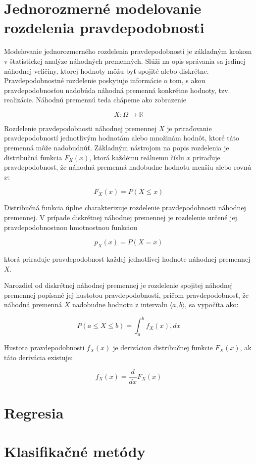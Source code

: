 \section{Jednorozmerné modelovanie rozdelenia pravdepodobnosti}\label{sec:1D_modelovanie}

Modelovanie jednorozmerného rozdelenia pravdepodobnosti je základným krokom v štatistickej analýze náhodných premenných. Slúži na opis správania sa jedinej náhodnej veličiny, ktorej hodnoty môžu byť spojité alebo diskrétne. Pravdepodobnostné rozdelenie poskytuje informácie o tom, s akou pravdepodobnosťou nadobúda náhodná premenná konkrétne hodnoty, tzv. realizácie. Náhodnú premennú teda chápeme ako zobrazenie 

\begin{equation*} 
X: \Omega \to \mathbb{R} 
\end{equation*}

Rozdelenie pravdepodobnosti náhodnej premennej $X$ je priraďovanie pravdepodobností jednotlivým hodnotám alebo množinám hodnôt, ktoré táto premenná môže nadobudnúť. Základným nástrojom na popis rozdelenia je distribučná funkcia $F_X(x)$, ktorá každému reálnemu číslu $x$ priraďuje pravdepodobnosť, že náhodná premenná nadobudne hodnotu menšiu alebo rovnú $x$: 

\begin{equation*} 
F_X(x) = P(X \leq x) 
\end{equation*}

Distribučná funkcia úplne charakterizuje rozdelenie pravdepodobnosti náhodnej premennej. V prípade diskrétnej náhodnej premennej je rozdelenie určené jej pravdepodobnostnou hmotnostnou funkciou 

\begin{equation*} 
p_X(x) = P(X = x) 
\end{equation*} 

ktorá priraďuje pravdepodobnosť každej jednotlivej hodnote náhodnej premennej $X$.

Narozdiel od diskrétnej náhodnej premennej je rozdelenie spojitej náhodnej premennej popísané jej hustotou pravdepodobnosti, pričom pravdepodobnosť, že náhodná premenná $X$ nadobudne hodnotu z intervalu $\langle a, b \rangle$, sa vypočíta ako: 

\begin{equation*}
P(a \leq X \leq b) = \int_{a}^{b} f_X(x) , dx 
\end{equation*}

Hustota pravdepodobnosti $f_X(x)$ je deriváciou distribučnej funkcie $F_X(x)$, ak táto derivácia existuje: 

\begin{equation*} 
f_X(x) = \frac{d}{dx} F_X(x) 
\end{equation*}

\section{Regresia}\label{sec:regresia}

\section{Klasifikačné metódy}\label{sec:klas_metody}